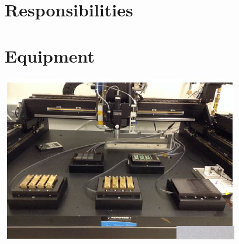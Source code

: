 \documentclass[12pt]{unlsilabsop}
\begin{document}
\section{Responsibilities}

\section{Equipment}
\begin{center}
\includegraphics{img/gluingSetup.jpg}
\end{center}
\end{document}
